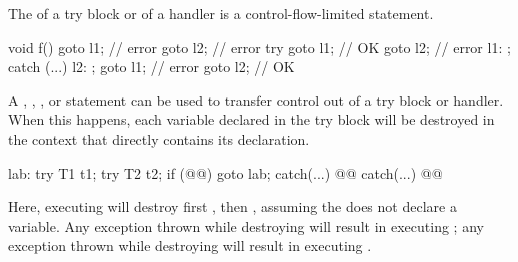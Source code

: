 \pnum
{}%
%
%
%
%
%
The  of a try block or of a handler is a
control-flow-limited statement.
\begin{example}
\begin{codeblock}
void f() {
  goto l1;          // error
  goto l2;          // error
  try {
    goto l1;        // OK
    goto l2;        // error
    l1: ;
  } catch (...) {
    l2: ;
    goto l1;        // error
    goto l2;        // OK
  }
}

\end{codeblock}
\end{example}
%
%
%
%
%
%
%
%
A
,
,
,
or
statement can be used to transfer control out of
a try block or handler.
When this happens, each variable declared in the try block
will be destroyed in the context that
directly contains its declaration.
\begin{example}
\begin{codeblock}
lab:  try {
  T1 t1;
  try {
    T2 t2;
    if (@@)
      goto lab;
    } catch(...) { @@ }
  } catch(...) { @@ }
\end{codeblock}

Here, executing
will destroy first
,
then
,
assuming the
does not declare a variable.
Any exception thrown while destroying
will result in executing
;
any exception thrown while destroying
will result in executing
.
\end{example}

